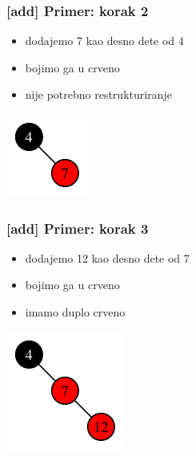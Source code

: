 \documentclass[compress,aspectratio=169]{beamer}
\begin{document}
\begin{frame}[fragile]
  \frametitle{[add] Primer: korak 2}
  \begin{itemize}
    \item dodajemo 7 kao desno dete od 4
    \item bojimo ga u crveno
    \item nije potrebno restrukturiranje
  \end{itemize}
  \begin{center}
    \includegraphics[scale=1.0]{asp-11-add-02.pdf}
  \end{center}
\end{frame}

\begin{frame}[fragile]
  \frametitle{[add] Primer: korak 3}
  \begin{itemize}
    \item dodajemo 12 kao desno dete od 7
    \item bojimo ga u crveno
    \item imamo duplo crveno
  \end{itemize}
  \begin{center}
    \includegraphics[scale=1.0]{asp-11-add-03.pdf}
  \end{center}
\end{frame}
\end{document}
